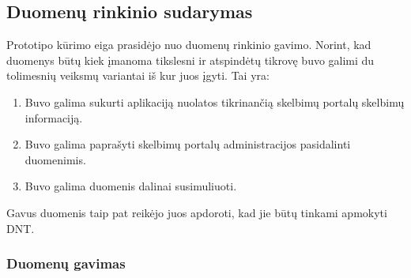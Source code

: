 \documentclass{VUMIFPSkursinis}
\begin{document}





\subsection{Duomenų rinkinio sudarymas}

Prototipo kūrimo eiga prasidėjo nuo duomenų rinkinio gavimo. Norint, kad duomenys būtų kiek įmanoma tikslesni ir atspindėtų tikrovę buvo galimi du tolimesnių veiksmų variantai iš kur juos įgyti. Tai yra:

\begin{enumerate}
  \item Buvo galima sukurti aplikaciją nuolatos tikrinančią skelbimų portalų skelbimų informaciją.
  \item Buvo galima paprašyti skelbimų portalų administracijos pasidalinti duomenimis. 
  \item Buvo galima duomenis dalinai susimuliuoti.
\end{enumerate} 

Gavus duomenis taip pat reikėjo juos apdoroti, kad jie būtų tinkami apmokyti DNT.

\subsubsection{Duomenų gavimas}
\end{document}
